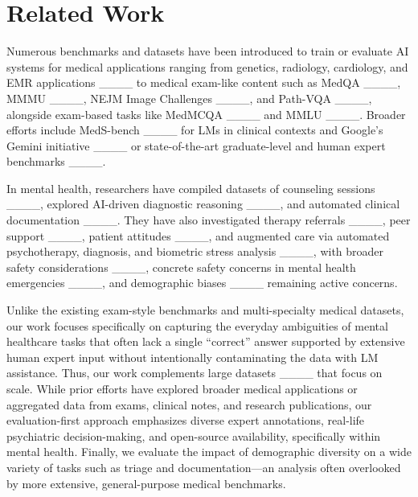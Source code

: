 \section{Related Work}
\label{sec:2_related_work}

Numerous benchmarks and datasets have been introduced to train or evaluate AI systems for medical applications
ranging from genetics, radiology, cardiology, and EMR applications ____ to medical exam-like content such as MedQA ____, MMMU ____, NEJM Image Challenges ____, and Path-VQA ____, alongside exam-based tasks like MedMCQA ____ and MMLU ____. 
Broader efforts include MedS-bench ____ for LMs in clinical contexts and Google’s Gemini initiative ____ or state-of-the-art graduate-level and human expert benchmarks ____. 

In mental health, researchers have compiled datasets of counseling sessions ____, explored AI-driven diagnostic reasoning ____, and automated clinical documentation ____. 
They have also investigated therapy referrals ____, peer support ____, patient attitudes ____, and augmented care via automated psychotherapy, diagnosis, and biometric stress analysis ____, with broader safety considerations ____, concrete safety concerns in mental health emergencies ____, and demographic biases ____ remaining active concerns.

Unlike the existing exam-style benchmarks and multi-specialty medical datasets, our work focuses specifically on capturing the everyday ambiguities of mental healthcare tasks that often lack a single “correct” answer supported by extensive human expert input without intentionally contaminating the data with LM assistance. 
Thus, our work complements large datasets ____ that focus on scale.
While prior efforts have explored broader medical applications or aggregated data from exams, clinical notes, and research publications, our evaluation-first approach emphasizes diverse expert annotations, real-life psychiatric decision-making, and open-source availability, specifically within mental health. 
Finally, we evaluate the impact of demographic diversity on a wide variety of tasks such as triage and documentation—an analysis often overlooked by more extensive, general-purpose medical benchmarks.






